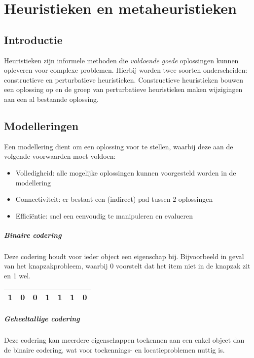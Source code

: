 \chapter{Heuristieken en metaheuristieken}

\section{Introductie}
Heuristieken zijn informele methoden die \emph{voldoende goede} oplossingen kunnen opleveren voor complexe problemen. 
Hierbij worden twee soorten onderscheiden: constructieve en perturbatieve heuristieken.
Constructieve heuristieken bouwen een oplossing op en de groep van perturbatieve heuristieken maken wijzigingen aan een al bestaande oplossing.

\section{Modelleringen}
Een modellering dient om een oplossing voor te stellen, waarbij deze aan de volgende voorwaarden moet voldoen:

\begin{itemize}
    \item Volledigheid: alle mogelijke oplossingen kunnen voorgesteld worden in de modellering
    \item Connectiviteit: er bestaat een (indirect) pad tussen 2 oplossingen
    \item Effici\"entie: snel een eenvoudig te manipuleren en evalueren
\end{itemize}

\paragraph{Binaire codering}
Deze codering houdt voor ieder object een eigenschap bij. 
Bijvoorbeeld in geval van het knapzakprobleem, waarbij 0 voorstelt dat het item niet in de knapzak zit en 1 wel.
%
\begin{table}[!h]
    \centering
    \begin{tabular}{|l|l|l|l|l|l|l|}
    \hline
    1 & 0 & 0 & 1 & 1 & 1 & 0 \\ \hline
    \end{tabular}
\end{table}
%
\paragraph{Geheeltallige codering}
Deze codering kan meerdere eigenschappen toekennen aan een enkel object dan de binaire codering, wat voor toekennings- en locatieproblemen nuttig is.

